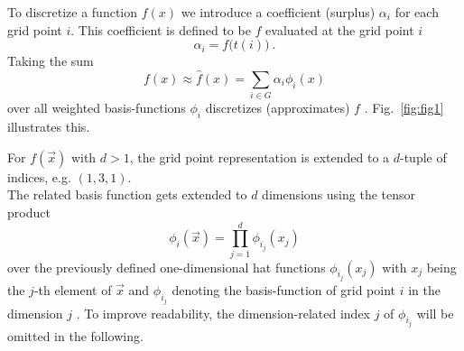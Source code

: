 \par

To discretize a function $f(x)$ we introduce a coefficient (surplus)
$\alpha_i$ for each grid point $i$. This coefficient is defined to be
$f$ evaluated at the grid point $i$
$$\alpha_i = f\big(t(i)\big) \ .$$
Taking the sum
$$ f(x) \approx  \hat{f}(x) = \sum_{i \in G}{\alpha_i \phi_i(x)} $$
over all weighted basis-functions $\phi_i$ discretizes (approximates) $f$
\cite{disspfl}.
Fig.~\ref{fig:fig1} illustrates this.

\par

For $f(\vec{x})$ with $d > 1$, the grid point representation is extended to
a $d$-tuple of indices, e.g. $(1,3,1)$. \\
The related basis function gets extended to $d$ dimensions using the tensor
product
$$\phi_i(\vec{x}) = \prod_{j=1}^d{\phi_{i_j}(x_j)}$$
over the previously defined one-dimensional hat functions
$\phi_{i_j}(x_j)$ with $x_j$ being the $j$-th element of $\vec{x}$ and
$\phi_{i_j}$ denoting the basis-function of grid point $i$ in the dimension
$j$ \cite{disspfl}.
To improve readability, the dimension-related index $j$ of $\phi_{i_j}$
will be omitted in the following.


